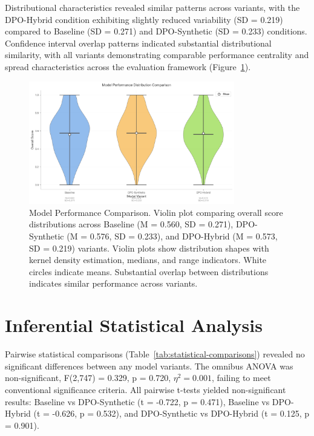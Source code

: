 Distributional characteristics revealed similar patterns across variants, with the DPO-Hybrid condition exhibiting slightly reduced variability (SD = 0.219) compared to Baseline (SD = 0.271) and DPO-Synthetic (SD = 0.233) conditions. Confidence interval overlap patterns indicated substantial distributional similarity, with all variants demonstrating comparable performance centrality and spread characteristics across the evaluation framework (Figure~\ref{fig:model-comparison}).

\begin{figure}[H]
\centering
\includegraphics[width=0.8\textwidth]{figures/model_comparison_boxplot.png}
\caption[Model Performance Comparison]{Model Performance Comparison. Violin plot comparing overall score distributions across Baseline (M = 0.560, SD = 0.271), DPO-Synthetic (M = 0.576, SD = 0.233), and DPO-Hybrid (M = 0.573, SD = 0.219) variants. Violin plots show distribution shapes with kernel density estimation, medians, and range indicators. White circles indicate means. Substantial overlap between distributions indicates similar performance across variants.}
\label{fig:model-comparison}
\end{figure}

\section{Inferential Statistical Analysis}
\label{sec:inferential-analysis}

Pairwise statistical comparisons (Table~\ref{tab:statistical-comparisons}) revealed no significant differences between any model variants. The omnibus ANOVA was non-significant, F(2,747) = 0.329, p = 0.720, $\eta^2 = 0.001$, failing to meet conventional significance criteria. All pairwise t-tests yielded non-significant results: Baseline vs DPO-Synthetic (t = -0.722, p = 0.471), Baseline vs DPO-Hybrid (t = -0.626, p = 0.532), and DPO-Synthetic vs DPO-Hybrid (t = 0.125, p = 0.901).

